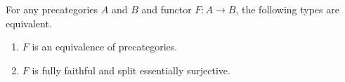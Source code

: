 \documentclass[hott-all.tex]{subfiles}
\begin{document}
\begin{lem}\label{ct:ffeso}
  For any precategories $A$ and $B$ and functor $F:A\to B$, the following types are equivalent.
  \begin{enumerate}
  \item $F$ is an equivalence of precategories.\label{item:ct:ffeso1}
  \item $F$ is fully faithful and split essentially surjective.\label{item:ct:ffeso2}
  \end{enumerate}
\end{lem}
%
%
%
\end{document}

